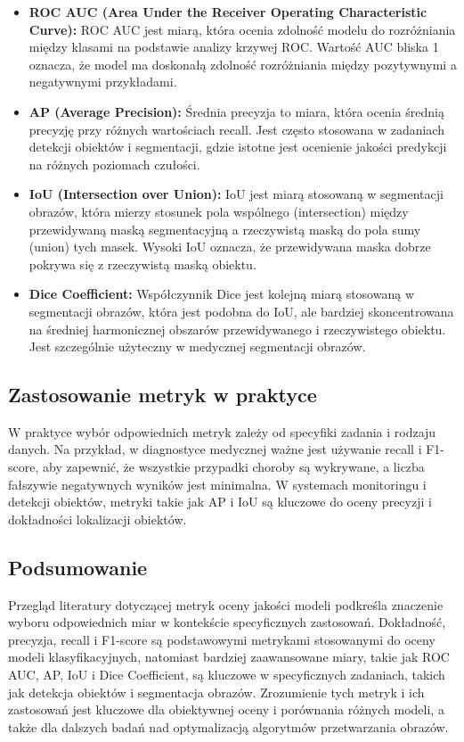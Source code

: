 \begin{itemize}
    \item \textbf{ROC AUC (Area Under the Receiver Operating Characteristic Curve): }
    ROC AUC jest miarą, która ocenia zdolność modelu do rozróżniania między klasami na podstawie 
    analizy krzywej ROC. Wartość AUC bliska 1 oznacza, że model ma doskonałą zdolność rozróżniania 
    między pozytywnymi a negatywnymi przykładami.
    \item \textbf{AP (Average Precision):} Średnia precyzja to miara, która ocenia średnią precyzję 
    przy różnych wartościach recall. Jest często stosowana w zadaniach detekcji obiektów i 
    segmentacji, gdzie istotne jest ocenienie jakości predykcji na różnych poziomach czułości.
    \item \textbf{IoU (Intersection over Union):} IoU jest miarą stosowaną w segmentacji obrazów, 
    która mierzy stosunek pola wspólnego (intersection) między przewidywaną maską segmentacyjną a 
    rzeczywistą maską do pola sumy (union) tych masek. Wysoki IoU oznacza, że przewidywana maska 
    dobrze pokrywa się z rzeczywistą maską obiektu.
    \item \textbf{Dice Coefficient:} Współczynnik Dice jest kolejną miarą stosowaną w segmentacji obrazów, 
    która jest podobna do IoU, ale bardziej skoncentrowana na średniej harmonicznej obszarów 
    przewidywanego i rzeczywistego obiektu. Jest szczególnie użyteczny w medycznej segmentacji obrazów.
\end{itemize}

\subsection*{Zastosowanie metryk w praktyce}

W praktyce wybór odpowiednich metryk zależy od specyfiki zadania i rodzaju danych. Na przykład, 
w diagnostyce medycznej ważne jest używanie recall i F1-score, aby zapewnić, że wszystkie przypadki 
choroby są wykrywane, a liczba fałszywie negatywnych wyników jest minimalna. W systemach monitoringu 
i detekcji obiektów, metryki takie jak AP i IoU są kluczowe do oceny precyzji i dokładności 
lokalizacji obiektów.

\subsection*{Podsumowanie}

Przegląd literatury dotyczącej metryk oceny jakości modeli podkreśla znaczenie wyboru odpowiednich 
miar w kontekście specyficznych zastosowań. Dokładność, precyzja, recall i F1-score są podstawowymi 
metrykami stosowanymi do oceny modeli klasyfikacyjnych, natomiast bardziej zaawansowane miary, takie 
jak ROC AUC, AP, IoU i Dice Coefficient, są kluczowe w specyficznych zadaniach, takich jak detekcja 
obiektów i segmentacja obrazów. Zrozumienie tych metryk i ich zastosowań jest kluczowe dla obiektywnej 
oceny i porównania różnych modeli, a także dla dalszych badań nad optymalizacją algorytmów 
przetwarzania obrazów.